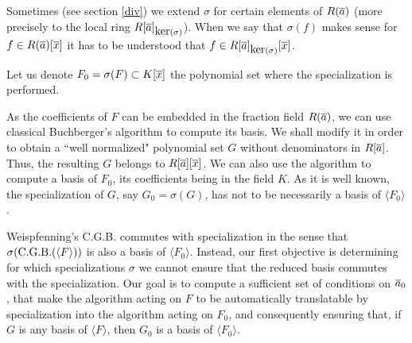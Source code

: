   Sometimes (see section \ref{div}) we extend $\sigma$ for certain elements of $R(\overline{a})$
  (more precisely to the local ring $R[\overline{a}]_{\hbox{\rm
  ker}(\sigma)}$). When we say that $\sigma(f)$ makes sense for $f
  \in R(\overline{a})[\overline{x}]$ it has to be understood that $f \in
  R[\overline{a}]_{\hbox{\rm ker}(\sigma)}[\overline{x}]$.

Let us denote $F_0=\sigma(F) \subset K[\overline{x}]$
the polynomial set where the specialization
is performed.

As the coefficients of $F$ can be embedded in the fraction field
$R(\overline{a})$, we can use classical Buchberger's algorithm to compute
its \Gr basis. We shall modify it in order to obtain a ``well
normalized" polynomial set $G$ without denominators in $R[\overline{a}]$.
Thus, the resulting $G$ belongs to $R[\overline{a}][\overline{x}]$. We can also use
the algorithm to compute a \Gr basis of $F_0$, its coefficients
being in the field $K$. As it is well known, the specialization of
$G$, say $G_0=\sigma(G)$, has not to be necessarily a \Gr basis of
$\langle F_0\rangle$.





Weispfenning's C.G.B. commutes with specialization in the sense
that $\sigma(\hbox{C.G.B.}(\langle F\rangle))$ is also a \Gr basis
of $\langle F_0\rangle$. Instead, our first objective is
determining for which specializations $\sigma$ we cannot ensure
that the reduced \Gr basis commutes with the specialization. Our
goal is to compute a sufficient set of conditions on $\overline{a}_0$, that
make the algorithm acting on $F$ to be automatically translatable
by specialization into the algorithm acting on $F_0$, and
consequently ensuring that, if $G$ is any \Gr basis of $\langle F
\rangle$, then  $G_0$ is a \Gr basis of $\langle F_0 \rangle$.

